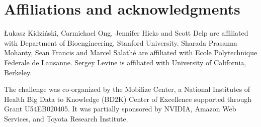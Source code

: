 \documentclass[graybox]{svmult}
\begin{document}
\section{Affiliations and acknowledgments}
{\L}ukasz Kidzi\'nski, Carmichael Ong, Jennifer Hicks and Scott Delp are affiliated with Department of Bioengineering, Stanford University. Sharada Prasanna Mohanty, Sean Francis and Marcel Salathé are affiliated with Ecole Polytechnique Federale de Lausanne. Sergey Levine is affiliated with University of California, Berkeley.

The challenge was co-organized by the Mobilize Center, a National Institutes of Health Big Data to Knowledge (BD2K) Center of Excellence supported through Grant U54EB020405. It was partially sponsored by NVIDIA, Amazon Web Services, and Toyota Research Institute.
\end{document}
